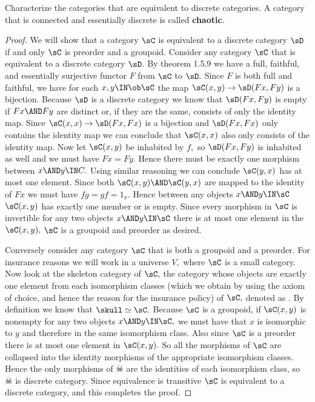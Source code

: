 \documentclass[../../main]{subfiles}
\begin{document}
\begin{exercise}
	Characterize the categories that are equivalent to
	discrete categories. A category that is connected and essentially
	discrete is called \textbf{chaotic}.
\end{exercise}
\begin{proof}
	We will show that a category $ \sC $ is equivalent to a discrete category $ \sD $ if and only $ \sC $ is preorder and a groupoid.
	Consider any category $ \sC $ that is equivalent to a discrete category
	$ \sD $. By theorem 1.5.9 we have a full, faithful, and essentially
	surjective functor $ F $ from $ \sC $ to $\sD. $ Since $ F $ is both
	full and
	faithful, we have for each $ x,y\IN\ob\sC $ the map $
	\sC(x,y)\to\sD(Fx,Fy) $ is a bijection. Because $ \sD $ is a discrete
	category we know that $ \sD(Fx,Fy) $ is empty if $ Fx\AND Fy $
	are distinct or, if they are the same, consists of only the identity
	map. Since $ \sC(x,x)\to \sD(Fx,Fx) $ is a bijection and $ \sD(Fx,Fx) $
	only contains the identity map we can conclude that $ \sC(x,x) $ also
	only consists of the identity map. Now let $\sC(x,y)$ be inhabited by $
	f, $ so $ \sD(Fx,Fy) $ is inhabited as well and we must have $ Fx=Fy.$
	Hence there must be exactly one morphism between $ x\AND y\IN C. $
	Using similar reasoning we can conclude $ \sC(y,x) $ has at most one
	element. Since both $ \sC(x,y) \AND \sC(y,x)$ are mapped to the
	identity of $ Fx $ we must have $fg=gf=1_x .$ Hence between any objects
	$ x\AND y\IN\sC $ $ \sC(x,y) $ has exactly one member or is empty. Since
	every morphism in $ \sC $ is invertible for any two objects $ x\AND
	y\IN\sC $ there is at most one element in the $ \sC(x,y),$ $ \sC $ is
	a groupoid and preorder as desired.

	Conversely consider any category $ \sC $ that is both a groupoid and a
	preorder. For insurance reasons we will work in a universe $ V, $
	where $ \sC $ is a small category.
	Now look at the skeleton category of $\sC, $ the category whose
	objects are exactly one element from each isomorphism classes (which we obtain by using the axiom of choice, and hence the reason for the insurance policy) of $ \sC,$ denoted
	as  \skull. By definition we know that $ \skull\simeq \sC.$ Because
	$ \sC $ is a groupoid, if $ \sC(x,y) $ is nonempty for any two objects
	$ x\AND y\IN\sC,$ we must have that $ x $ is isomorphic to $ y$ and
	therefore in the same isomorphism class. Also since $ \sC $ is a
	preorder there is at most one element in $ \sC(x,y).$ So all the
	morphisms of $ \sC $ are collapsed into the identity morphisms of the
	appropriate isomorphism classes. Hence the only morphisms of $ \skull $
	are the identities of each isomorphism class, so $ \skull $ is discrete
	category. Since equivalence is transitive $ \sC $ is equivalent to a
	discrete category, and this completes the proof.
\end{proof}
\end{document}
